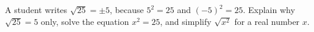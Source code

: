 A student writes $\sqrt{25}=\pm5$, because $5^2=25$ and $(-5)^2=25$. Explain why $\sqrt{25}=5$ only, solve the equation $x^2=25$, and simplify $\sqrt{x^2}$ for a real number $x$.
